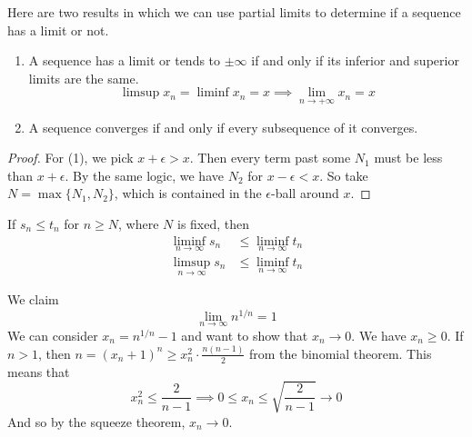   \begin{theorem}
    Here are two results in which we can use partial limits to determine if a sequence has a limit or not. 
    \begin{enumerate}
      \item A sequence has a limit or tends to $\pm \infty$ if and only if its inferior and superior limits are the same. 
      \begin{equation}
        \limsup x_n = \liminf x_n = x \implies \lim_{n \rightarrow +\infty} x_n = x
      \end{equation}
      \item A sequence converges if and only if every subsequence of it converges. 
    \end{enumerate}
  \end{theorem}
  \begin{proof}
    For (1), we pick $x + \epsilon > x$. Then every term past some $N_1$ must be less than $x + \epsilon$. By the same logic, we have $N_2$ for $x - \epsilon < x$. So take $N = \max\{N_1, N_2\}$, which is contained in the $\epsilon$-ball around $x$. 
  \end{proof}

  \begin{theorem}
    If $s_n \leq t_n$ for $n \geq N$, where $N$ is fixed, then 
    \begin{align*}
      \liminf_{n \rightarrow \infty} s_n & \leq \liminf_{n \rightarrow \infty} t_n \\
      \limsup_{n \rightarrow \infty} s_n & \leq \liminf_{n \rightarrow \infty} t_n 
    \end{align*}
  \end{theorem} 

  \begin{example}
    We claim 
    \begin{equation}
      \lim_{n \rightarrow \infty} n^{1/n} = 1 
    \end{equation}
    We can consider $x_n = n^{1/n} - 1$ and want to show that $x_n \rightarrow 0$. We have $x_n \geq 0$. If $n > 1$, then $n = (x_n + 1)^n \geq x_n^2 \cdot \frac{n(n - 1)}{2}$ from the binomial theorem. This means that 
    \begin{equation}
      x_n^2 \leq \frac{2}{n-1} \implies 0 \leq x_n \leq \sqrt{\frac{2}{n-1}} \rightarrow 0
    \end{equation}
    And so by the squeeze theorem, $x_n \rightarrow 0$. 
  \end{example}

